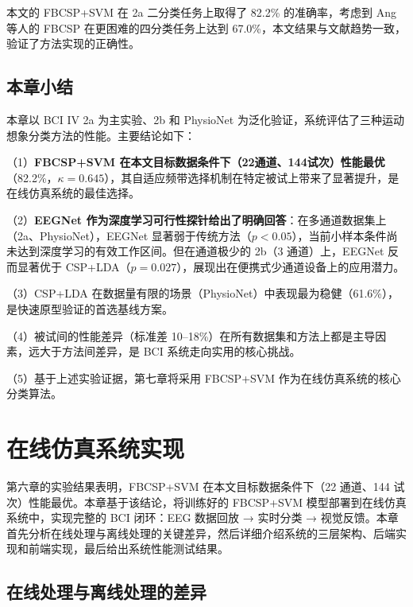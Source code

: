本文的 FBCSP+SVM 在 2a 二分类任务上取得了 82.2\% 的准确率，考虑到 Ang 等人的 FBCSP 在更困难的四分类任务上达到 67.0\%，本文结果与文献趋势一致，验证了方法实现的正确性。

\subsection{本章小结}

本章以 BCI IV 2a 为主实验、2b 和 PhysioNet 为泛化验证，系统评估了三种运动想象分类方法的性能。主要结论如下：

（1）\textbf{FBCSP+SVM 在本文目标数据条件下（22通道、144试次）性能最优}（82.2\%，$\kappa = 0.645$），其自适应频带选择机制在特定被试上带来了显著提升，是在线仿真系统的最佳选择。

（2）\textbf{EEGNet 作为深度学习可行性探针给出了明确回答}：在多通道数据集上（2a、PhysioNet），EEGNet 显著弱于传统方法（$p < 0.05$），当前小样本条件尚未达到深度学习的有效工作区间。但在通道极少的 2b（3 通道）上，EEGNet 反而显著优于 CSP+LDA（$p = 0.027$），展现出在便携式少通道设备上的应用潜力。

（3）CSP+LDA 在数据量有限的场景（PhysioNet）中表现最为稳健（61.6\%），是快速原型验证的首选基线方案。

（4）被试间的性能差异（标准差 10--18\%）在所有数据集和方法上都是主导因素，远大于方法间差异，是 BCI 系统走向实用的核心挑战。

（5）基于上述实验证据，第七章将采用 FBCSP+SVM 作为在线仿真系统的核心分类算法。


\section{在线仿真系统实现}
\label{sec:online-system}

第六章的实验结果表明，FBCSP+SVM 在本文目标数据条件下（22 通道、144 试次）性能最优。本章基于该结论，将训练好的 FBCSP+SVM 模型部署到在线仿真系统中，实现完整的 BCI 闭环：EEG 数据回放 → 实时分类 → 视觉反馈。本章首先分析在线处理与离线处理的关键差异，然后详细介绍系统的三层架构、后端实现和前端实现，最后给出系统性能测试结果。

\subsection{在线处理与离线处理的差异}
\label{sec:online-vs-offline}


